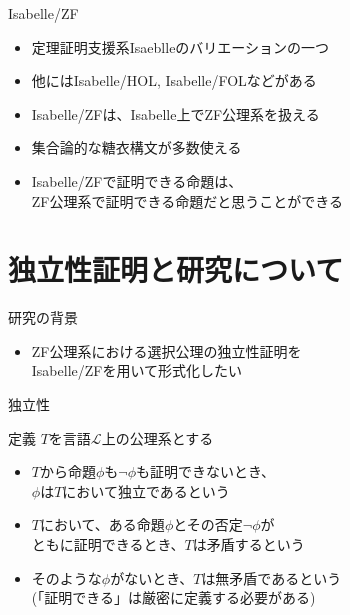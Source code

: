 \documentclass[17pt,aspectratio=169,xcolor=dvipsnames,table,dvipdfmx]{beamer}
\theoremstyle{definition}
\begin{document}
\begin{frame} {Isabelle/ZF}
    \begin{itemize}
        \item 定理証明支援系Isaeblleのバリエーションの一つ
        \item 他にはIsabelle/HOL, Isabelle/FOLなどがある
        \item Isabelle/ZFは、Isabelle上でZF公理系を扱える
        \item 集合論的な糖衣構文が多数使える
        \item Isabelle/ZFで証明できる命題は、\\
              ZF公理系で証明できる命題だと思うことができる
    \end{itemize}
\end{frame}

\section{独立性証明と研究について}

\begin{frame} {研究の背景}
    \begin{itemize}
        \item ZF公理系における選択公理の独立性証明を\\Isabelle/ZFを用いて形式化したい
    \end{itemize}
\end{frame}

\begin{frame} {独立性}
    \begin{block}{定義}
        $T$を言語$\mathcal{L}$上の公理系とする
        \begin{itemize}
            \item $T$から命題$\phi$も$\neg \phi$も証明できないとき、\\ $\phi$は$T$において独立であるという
            \item $T$において、ある命題$\phi$とその否定$\neg \phi$が\\ともに証明できるとき、$T$は矛盾するという
            \item そのような$\phi$がないとき、$T$は無矛盾であるという \\ {\footnotesize (「証明できる」は厳密に定義する必要がある)}
        \end{itemize}
    \end{block}

\end{frame}
\end{document}
